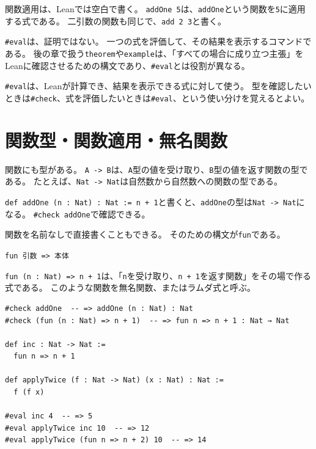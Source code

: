 関数適用は、Leanでは空白で書く。
\texttt{addOne 5}は、\texttt{addOne}という関数を\texttt{5}に適用する式である。
二引数の関数も同じで、\texttt{add 2 3}と書く。

\begin{leanbox}
\texttt{\#eval}は、証明ではない。
一つの式を評価して、その結果を表示するコマンドである。
後の章で扱う\texttt{theorem}や\texttt{example}は、「すべての場合に成り立つ主張」をLeanに確認させるための構文であり、\texttt{\#eval}とは役割が異なる。
\end{leanbox}

\begin{warningbox}
\texttt{\#eval}は、Leanが計算でき、結果を表示できる式に対して使う。
型を確認したいときは\texttt{\#check}、式を評価したいときは\texttt{\#eval}、という使い分けを覚えるとよい。
\end{warningbox}

\section{関数型・関数適用・無名関数}

関数にも型がある。
\texttt{A -> B}は、\texttt{A}型の値を受け取り、\texttt{B}型の値を返す関数の型である。
たとえば、\texttt{Nat -> Nat}は自然数から自然数への関数の型である。

\texttt{def addOne (n : Nat) : Nat := n + 1}と書くと、\texttt{addOne}の型は\texttt{Nat -> Nat}になる。
\texttt{\#check addOne}で確認できる。

関数を名前なしで直接書くこともできる。
そのための構文が\texttt{fun}である。

\begin{center}
\texttt{fun 引数 => 本体}
\end{center}

\texttt{fun (n : Nat) => n + 1}は、「\texttt{n}を受け取り、\texttt{n + 1}を返す関数」をその場で作る式である。
このような関数を無名関数、またはラムダ式と呼ぶ。

\begin{listing}[htbp]
\begin{verbatim}
#check addOne  -- => addOne (n : Nat) : Nat
#check (fun (n : Nat) => n + 1)  -- => fun n => n + 1 : Nat → Nat

def inc : Nat -> Nat :=
  fun n => n + 1

def applyTwice (f : Nat -> Nat) (x : Nat) : Nat :=
  f (f x)

#eval inc 4  -- => 5
#eval applyTwice inc 10  -- => 12
#eval applyTwice (fun n => n + 2) 10  -- => 14
\end{verbatim}
\caption{関数型と無名関数}
\label{lst:ch01-function-types-lambda}
\end{listing}

